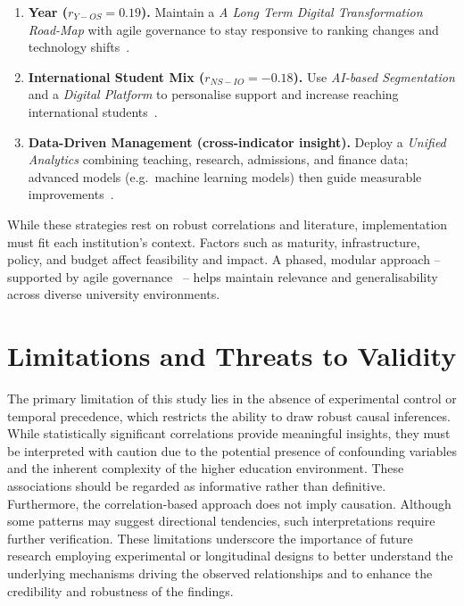 \documentclass[conference]{IEEEtran}
\begin{document}
\begin{enumerate}
	\item \textbf{Year ($r_{Y-OS}=0.19$).} Maintain a \emph{A Long Term Digital Transformation Road-Map} with agile governance to stay responsive to ranking changes and technology shifts~\cite{hashim2021higher,kuzu2020digital}.
	
	\item \textbf{International Student Mix ($r_{NS-IO}=-0.18$).} Use \emph{AI-based Segmentation} and a \emph{Digital Platform} to personalise support and increase reaching international students~\cite{komljenovic2020platformisation,perkins2021ai}.
	
	\item \textbf{Data-Driven Management (cross-indicator insight).} Deploy a \emph{Unified Analytics} combining teaching, research, admissions, and finance data; advanced models (e.g.\ machine learning models) then guide measurable improvements~\cite{dede2021data,singh2020predictive}.
\end{enumerate}

\noindent
While these strategies rest on robust correlations and literature, implementation must fit each institution’s context. Factors such as maturity, infrastructure, policy, and budget affect feasibility and impact. A phased, modular approach -- supported by agile governance~\cite{wirsing2021agile} -- helps maintain relevance and generalisability across diverse university environments.



\section{Limitations and Threats to Validity}

The primary limitation of this study lies in the absence of experimental control or temporal precedence, which restricts the ability to draw robust causal inferences. While statistically significant correlations provide meaningful insights, they must be interpreted with caution due to the potential presence of confounding variables and the inherent complexity of the higher education environment. These associations should be regarded as informative rather than definitive. Furthermore, the correlation-based approach does not imply causation. Although some patterns may suggest directional tendencies, such interpretations require further verification. These limitations underscore the importance of future research employing experimental or longitudinal designs to better understand the underlying mechanisms driving the observed relationships and to enhance the credibility and robustness of the findings.
\end{document}

